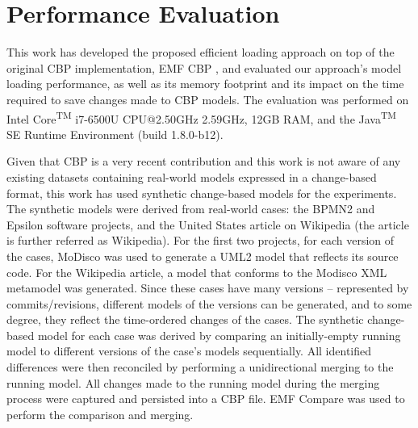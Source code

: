 {\section{Performance Evaluation}
\label{sec:performance_evaluation}

This work has developed the proposed efficient loading approach on top of the original CBP implementation, EMF CBP \cite{DBLP:conf/models/YohannisKP17,epsilonlabs2019emfcbp}, and evaluated our approach's model loading performance, as well as its memory footprint and its impact on the time required to save changes made to CBP models. The evaluation was performed on Intel\textsuperscript{\textregistered} Core\textsuperscript{TM} i7-6500U CPU@2.50GHz 2.59GHz, 12GB RAM, and the Java\textsuperscript{TM} SE Runtime Environment (build 1.8.0-b12).

Given that CBP is a very recent contribution and this work is not aware of any existing datasets containing real-world models expressed in a change-based format, this work has used synthetic change-based models for the experiments. The synthetic models were derived from real-world cases: the BPMN2 \cite{eclipse2017bpmn2,eclipse2018bpmn2git} and Epsilon \cite{eclipse2017epsilon,eclipse2018epsilongit} software projects, and the United States article \cite{wikipedia2018us} on Wikipedia (the article is further referred as Wikipedia). For the first two projects, for each version of the cases, MoDisco \cite{DBLP:journals/infsof/BruneliereCDM14} was used to generate a UML2 \cite{eclipse2017uml2} model that reflects its source code. For the Wikipedia article, a model that conforms to the Modisco XML metamodel \cite{eclipse2018modiscoxml} was generated. Since these cases have many versions -- represented by commits/revisions, different models of the versions can be generated, and to some degree, they reflect the time-ordered changes of the cases. The synthetic change-based model for each case was derived by comparing an initially-empty running model to different versions of the case's models sequentially. All identified differences were then reconciled by performing a unidirectional merging to the running model. All changes made to the running model during the merging process were captured and persisted into a CBP file. EMF Compare was used \cite{eclipse2017compare} to perform the comparison and merging.

}
